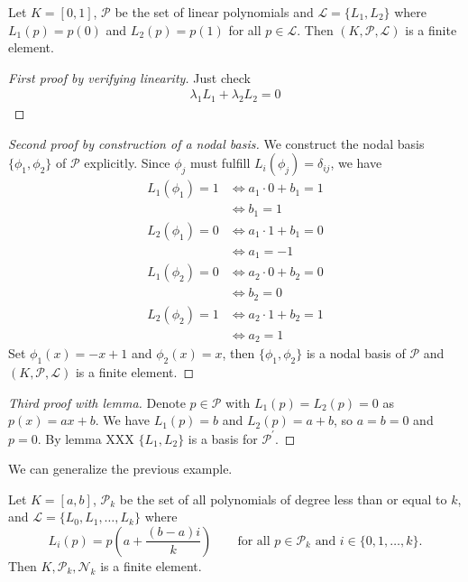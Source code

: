 \begin{example}
    Let \(K = [0, 1]\), \(\mathcal{P}\) be the set of linear polynomials and \(\mathcal{L} = \{L_1, L_2\}\) where \(L_1(p) = p(0)\) and \(L_2(p) = p(1)\) for all \(p \in \mathcal{L}\). Then \((K, \mathcal{P}, \mathcal{L})\) is a finite element.
\end{example}
\begin{proof}[First proof by verifying linearity]
    Just check
    \begin{align*}
        \lambda_1 L_1 + \lambda_2 L_2 = 0
    \end{align*}
\end{proof}
\begin{proof}[Second proof by construction of a nodal basis]
    We construct the nodal basis \(\{\phi_1, \phi_2\}\) of \(\mathcal{P}\) explicitly. Since \(\phi_j\) must fulfill \(L_i (\phi_j) = \delta_{ij}\), we have
    \begin{align*}
        L_1 (\phi_1) = 1 & \iff a_1 \cdot 0 + b_1 = 1 \\
        & \iff b_1 = 1 \\
        L_2 (\phi_1) = 0 & \iff a_1 \cdot 1 + b_1 = 0 \\
        & \iff a_1 = -1 \\
        L_1 (\phi_2) = 0 & \iff a_2 \cdot 0 + b_2 = 0 \\
        & \iff b_2 = 0 \\
        L_2 (\phi_2) = 1 & \iff a_2 \cdot 1 + b_2 = 1 \\
        & \iff a_2 = 1
    \end{align*}
    Set \(\phi_1(x) = - x + 1\) and \(\phi_2(x) = x\), then \(\{\phi_1, \phi_2\}\) is a nodal basis of \(\mathcal{P}\) and \((K, \mathcal{P}, \mathcal{L})\) is a finite element.
\end{proof}
\begin{proof}[Third proof with lemma]
    Denote \(p \in \mathcal{P}\) with \(L_1(p) = L_2(p) = 0\) as \(p(x) = ax+b\). We have \(L_1(p) = b\) and \(L_2(p) = a + b\), so \(a = b = 0\) and \(p = 0\). By lemma XXX \(\{L_1, L_2\}\) is a basis for \(\mathcal{P}^\prime\).
\end{proof}


We can generalize the previous example.

\begin{example}
    Let \(K = [a, b]\), \(\mathcal{P}_k\) be the set of all polynomials of degree less than or equal to \(k\), and \(\mathcal{L} = \{L_0, L_1, \ldots, L_k\}\) where
    \begin{equation}
        L_i (p) = p \left( a + \frac{(b-a) i}{k} \right) \qquad \text{for all \(p \in \mathcal{P}_k\) and \(i \in \{0, 1, \ldots, k\}\).}
    \end{equation}
    Then \(K, \mathcal{P}_k, \mathcal{N}_k\) is a finite element.
\end{example}

